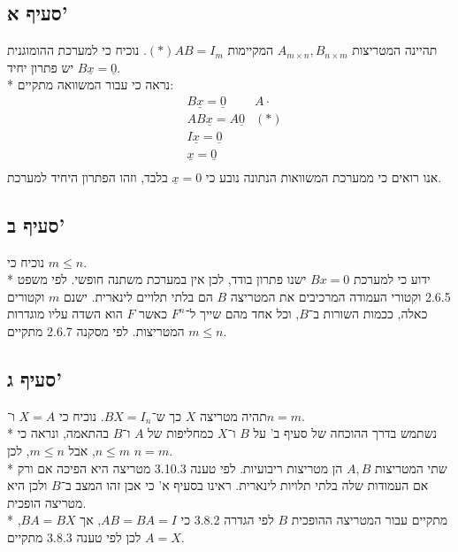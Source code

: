 \documentclass[a4paper, 10pt]{article}
\begin{document}
\begin{hebrew}
	\subsection{סעיף א'}
	תהיינה המטריצות $A_{m \times n}, B_{n \times m}$
	המקיימות $(*)AB=I_m$.
	נוכיח כי למערכת ההומוגנית $B\underline{x} = \underline{0}$
	יש פתרון יחיד. \\*
	נראה כי עבור המשוואה מתקיים:
	\[
		\begin{aligned}
			& B \underline{x} = \underline{0} & A \cdot \\
			& A B \underline{x} = A \underline{0} & (*) \\
			& I \underline{x} = \underline{0} \\
			& \underline{x} = \underline{0} \\
		\end{aligned}
	\]
	אנו רואים כי ממערכת המשוואות הנתונה נובע כי
	$\underline{x} = 0$ בלבד, וזהו הפתרון היחיד למערכת.

	\subsection{סעיף ב'}
	נוכיח כי $m \le n$. \\*
	ידוע כי למערכת $Bx = 0$ ישנו פתרון בודד, לכן אין במערכת משתנה חופשי.
	לפי משפט 2.6.5 וקטורי העמודה המרכיבים את המטריצה $B$
	הם בלתי תלויים לינארית.
	ישנם $m$ וקטורים כאלה,
	ככמות השורות ב־$B$, וכל אחד מהם שייך ל־$F^n$ כאשר $F$
	הוא השדה עליו מוגדרות המטריצות.
	לפי מסקנה 2.6.7 מתקיים $m \le n$.

	\subsection{סעיף ג'}
	תהיה מטריצה $X$ כך ש־$BX = I_n$. נוכיח כי $X = A$ ו־$n = m$. \\*
	נשתמש בדרך ההוכחה של סעיף ב’ על $B$ ו־$X$
	כמחליפות של $A$ ו־$B$ בהתאמה,
	ונראה כי $n \le m$, אבל $m \le n$, לכן $n = m$. \\*
	שתי המטריצות $A, B$ הן מטריצות ריבועיות.
	לפי טענה 3.10.3 מטריצה היא הפיכה אם ורק אם העמודות שלה בלתי
	תלויות לינארית. ראינו בסעיף א’ כי אכן זהו המצב ב־$B$ ולכן
	היא מטריצה הופכית. \\*
	מתקיים עבור המטריצה ההופכית $B$ לפי הגדרה 3.8.2 כי $AB = BA = I$,
	אך $BA = BX$, לכן לפי טענה  3.8.3 מתקיים $A = X$.


\end{hebrew}
\end{document}
